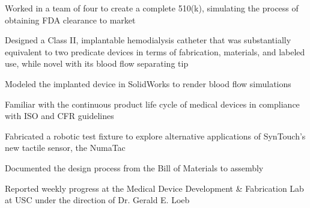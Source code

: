 \documentclass[letterpaper]{deedy-resume} %
\begin{document}
\begin{minipage}[t]{0.66\textwidth}
\sectionspace



\begin{tightitemize}
\item Worked in a team of four to create a complete 510(k), simulating the process of obtaining FDA clearance to market
\item Designed a Class II, implantable hemodialysis catheter that was substantially equivalent to two predicate devices in terms of fabrication, materials, and labeled use, while novel with its blood flow separating tip 
\item Modeled the implanted device in SolidWorks to render blood flow simulations 
\item Familiar with the continuous product life cycle of medical devices in compliance with ISO and CFR guidelines 
\end{tightitemize}

\sectionspace %



\begin{tightitemize}
\item Fabricated a robotic test fixture to explore alternative applications of SynTouch's new tactile sensor, the NumaTac
\item Documented the design process from the Bill of Materials to assembly
\item Reported weekly progress at the Medical Device Development \& Fabrication Lab at USC under the direction of Dr. Gerald E. Loeb 
\end{tightitemize}



\end{minipage} %



\end{document}
